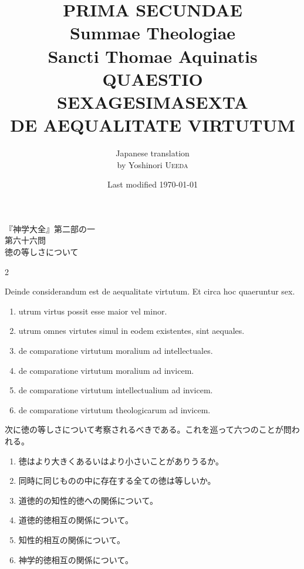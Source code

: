 \documentclass[paper=a4paper,fontsize=10pt,jafontsize=9pt,titlepage]{jlreq}
\title{{\bfseries PRIMA SECUNDAE}\\{\Huge Summae Theologiae}\\Sancti Thomae
Aquinatis\\{\sffamily QUAESTIO SEXAGESIMASEXTA}\\DE AEQUALITATE VIRTUTUM}
\author{Japanese translation\\by Yoshinori {\scshape Ueeda}}
\date{Last modified \today}
\begin{document}
\maketitle
\thispagestyle{empty}

\begin{center}
{\LARGE 『神学大全』第二部の一}\\
{\Large 第六十六問\\徳の等しさについて}
\end{center}

\begin{paracol}{2}

Deinde considerandum est de aequalitate virtutum. Et circa hoc
quaeruntur sex. 

\begin{enumerate}
 \item utrum virtus possit esse maior vel minor.
 \item utrum omnes virtutes simul in eodem existentes, sint aequales.
 \item de comparatione virtutum moralium ad intellectuales.
 \item de comparatione virtutum moralium ad invicem.
 \item de comparatione virtutum intellectualium ad invicem.
 \item de comparatione virtutum theologicarum ad invicem.
\end{enumerate}

\switchcolumn

次に徳の等しさについて考察されるべきである。これを巡って六つのことが問われる。

\begin{enumerate}
 \item 徳はより大きくあるいはより小さいことがありうるか。
 \item 同時に同じものの中に存在する全ての徳は等しいか。
 \item 道徳的の知性的徳への関係について。
 \item 道徳的徳相互の関係について。
 \item 知性的相互の関係について。
 \item 神学的徳相互の関係について。
\end{enumerate}

\end{paracol}

\newpage
{}
{}
\setcounter{section}{1}
\setcounter{subsection}{0}
\end{document}
